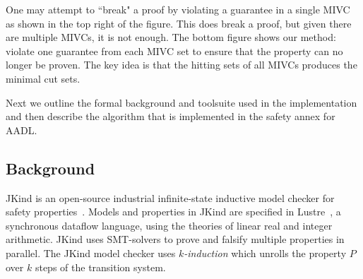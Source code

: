 One may attempt to ``break" a proof by violating a guarantee in a single MIVC as shown in the top right of the figure. This does break a proof, but given there are multiple MIVCs, it is not enough. The bottom figure shows our method: violate one guarantee from each MIVC set to ensure that the property can no longer be proven. The key idea is that the hitting sets of all MIVCs produces the minimal cut sets. 

Next we outline the formal background and toolsuite used in the implementation and then describe the algorithm that is implemented in the safety annex for AADL. 

\subsection{Background}
JKind is an open-source industrial infinite-state inductive model checker for safety properties~\cite{2017arXiv171201222G}. Models and properties in JKind are specified in Lustre~\cite{Halbwachs91:IEEE}, a synchronous dataflow language, using the theories of linear real and integer arithmetic. JKind uses SMT-solvers to prove and falsify multiple properties in parallel. The JKind model checker uses {\em
  $k$-induction} which unrolls the property $P$ over $k$ steps of the
transition system.

